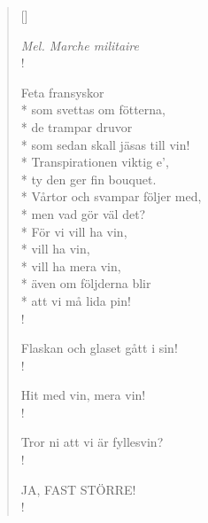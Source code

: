 
\settowidth{\versewidth}{som sedan skall jäsas till vin!}



\begin{verse}[\versewidth]

\flagverse{}
\emph{Mel. Marche militaire}\\!

Feta fransyskor\\*
som svettas om fötterna,\\*
de trampar druvor\\*
som sedan skall jäsas till vin!\\*
Transpirationen viktig e',\\*
ty den ger fin bouquet.\\*
Vårtor och svampar följer med,\\*
men vad gör väl det?\\*
För vi vill ha vin,\\*
vill ha vin,\\*
vill ha mera vin,\\*
även om följderna blir\\*
att vi må lida pin!\\!


Flaskan och glaset gått i sin!\\!


Hit med vin, mera vin!\\!


Tror ni att vi är fyllesvin?\\!


JA, FAST STÖRRE!\\!




\end{verse}

